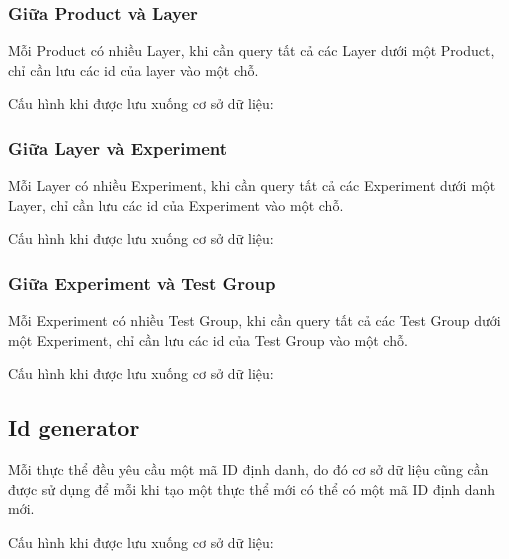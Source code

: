 \subsubsection{Giữa Product và Layer}

Mỗi Product có nhiều Layer, khi cần query tất cả các Layer dưới một Product, chỉ cần lưu
các id của layer vào một chỗ.

Cấu hình khi được lưu xuống cơ sở dữ liệu:

\begin{itemize}
\end{itemize}

\subsubsection{Giữa Layer và Experiment}

Mỗi Layer có nhiều Experiment, khi cần query tất cả các Experiment dưới một Layer, chỉ cần lưu
các id của Experiment vào một chỗ.

Cấu hình khi được lưu xuống cơ sở dữ liệu:

\begin{itemize}
\end{itemize}

\subsubsection{Giữa Experiment và Test Group}

Mỗi Experiment có nhiều Test Group, khi cần query tất cả các Test Group dưới một Experiment, chỉ cần lưu
các id của Test Group vào một chỗ.

Cấu hình khi được lưu xuống cơ sở dữ liệu:

\begin{itemize}
\end{itemize}

\subsection{Id generator}

Mỗi thực thể đều yêu cầu một mã ID định danh, do đó cơ sở dữ liệu cũng cần được sử dụng để mỗi
khi tạo một thực thể mới có thể có một mã ID định danh mới.

Cấu hình khi được lưu xuống cơ sở dữ liệu:

\begin{itemize}
\end{itemize}
